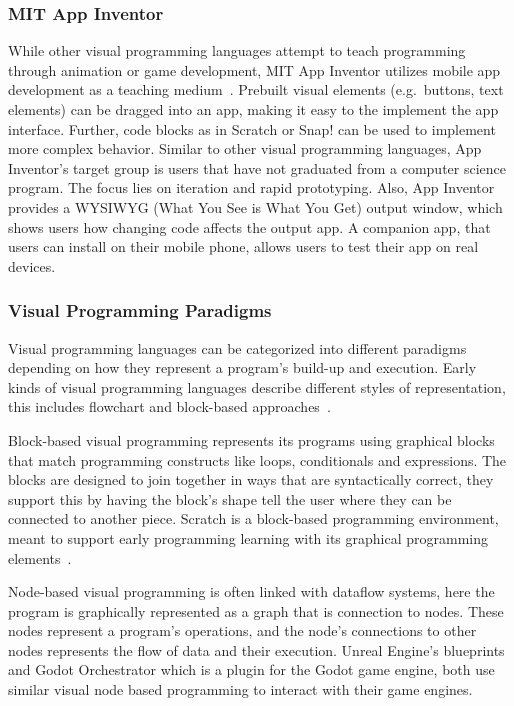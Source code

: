 \subsubsection{MIT App Inventor}
While other visual programming languages attempt to teach programming through animation or game development, MIT App Inventor utilizes mobile app development as a teaching medium~\cite{patton_mit_2019}.
Prebuilt visual elements (e.g.\ buttons, text elements) can be dragged into an app, making it easy to the implement the app interface.
Further, code blocks as in Scratch or Snap! can be used to implement more complex behavior.
Similar to other visual programming languages, App Inventor's target group is users that have not graduated from a computer science program.
The focus lies on iteration and rapid prototyping.
Also, App Inventor provides a WYSIWYG (What You See is What You Get) output window, which shows users how changing code affects the output app.
A companion app, that users can install on their mobile phone, allows users to test their app on real devices.

\subsubsection{Visual Programming Paradigms}
Visual programming languages can be categorized into different paradigms depending on how they represent a program's build-up and execution.
Early kinds of visual programming languages describe different styles of representation, this includes flowchart and block-based approaches~\cite{myers_taxonomies_1990}.

Block-based visual programming represents its programs using graphical blocks that match programming constructs like loops, conditionals and expressions.
The blocks are designed to join together in ways that are syntactically correct, they support this by having the block's shape tell the user where they can be connected to another piece.
Scratch is a block-based programming environment, meant to support early programming learning with its graphical programming elements~\cite{resnick_scratch_2009}.

Node-based visual programming is often linked with dataflow systems, here the program is graphically represented as a graph that is connection to nodes.
These nodes represent a program's operations, and the node's connections to other nodes represents the flow of data and their execution.
Unreal Engine's blueprints\cite{epicgames_blueprints_2025} and Godot Orchestrator\cite{godot_orchestrator} which is a plugin for the Godot game engine, both use similar visual node based programming to interact with their game engines.


